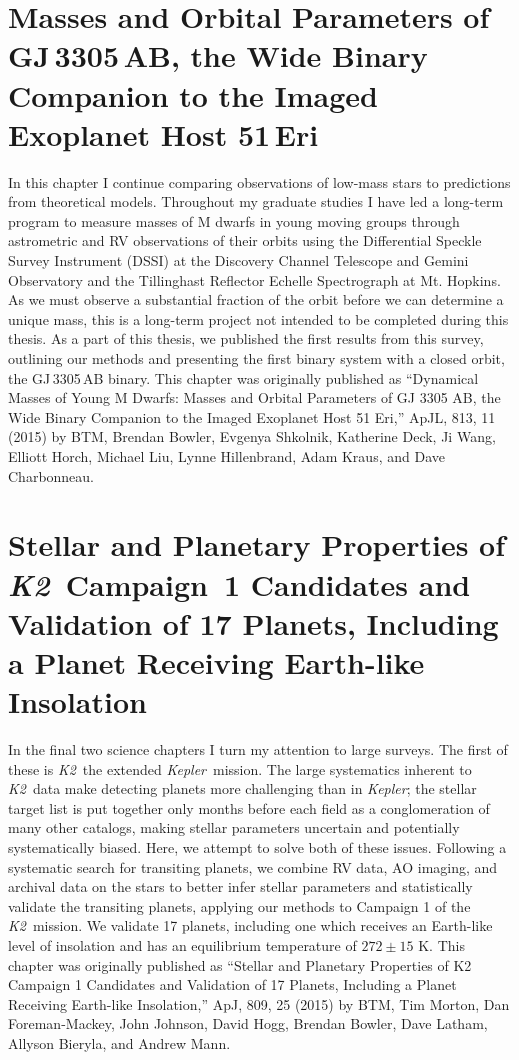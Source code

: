 \documentclass[12pt]{caltech_thesis}
\newcommand{\kep}{{\textit {Kepler}}}
\newcommand{\KT}{{\textit {K2}}}
\begin{document}
%

\chapter{Masses and Orbital Parameters of GJ\,3305\,AB, the Wide Binary Companion to the Imaged Exoplanet Host 51\,Eri}
\label{chap:Mbinaries}

In this chapter I continue comparing observations of low-mass stars to predictions from theoretical models.
Throughout my graduate studies I have led a long-term program to measure masses of M dwarfs in young moving groups
through astrometric and RV observations of their orbits using the Differential Speckle Survey Instrument (DSSI) at the 
Discovery Channel Telescope and Gemini Observatory and the Tillinghast Reflector Echelle Spectrograph at 
Mt. Hopkins.
As we must observe a substantial fraction of the orbit before we can determine a unique mass, this is a long-term project
not intended to be completed during this thesis.
As a part of this thesis, we published the first results from this survey, outlining our methods and presenting the first binary
system with a closed orbit, the GJ\,3305\,AB binary.
This chapter was originally published as ``Dynamical Masses of Young M Dwarfs: Masses and Orbital Parameters of GJ 3305 AB, the Wide Binary Companion to the Imaged Exoplanet Host 51 Eri,'' ApJL, 813, 11 (2015) by BTM, Brendan Bowler, 
Evgenya Shkolnik, Katherine Deck, Ji Wang, Elliott Horch, Michael Liu, Lynne Hillenbrand, Adam Kraus, and Dave 
Charbonneau.


%

\chapter{Stellar and Planetary Properties of \KT\ Campaign~1 Candidates and Validation of 17 Planets, Including a Planet Receiving Earth-like Insolation}
\label{chap:k2}
In the final two science chapters I turn my attention to large surveys. The first of these is \KT\ the extended \kep\ mission.
The large systematics inherent to \KT\ data make detecting planets more challenging than in \kep; the stellar target list is
put together only months before each field as a conglomeration of many other catalogs, making stellar parameters uncertain
and potentially systematically biased.
Here, we attempt to solve both of these issues.
Following a systematic search for transiting planets, we combine RV data, AO imaging, and archival data on the stars to
better infer stellar parameters and statistically validate the transiting planets, applying our methods to Campaign 1 of the
\KT\ mission.
We validate 17 planets, including one which receives an Earth-like level of insolation and has an equilibrium temperature of $272 \pm 15$ K.
This chapter was originally published as ``Stellar and Planetary Properties of K2 Campaign 1 Candidates and Validation of 17 Planets, Including a Planet Receiving Earth-like Insolation,'' ApJ, 809, 25 (2015) by BTM, Tim Morton, Dan Foreman-Mackey,
John Johnson, David Hogg, Brendan Bowler, Dave Latham, Allyson Bieryla, and Andrew Mann.
\end{document}
